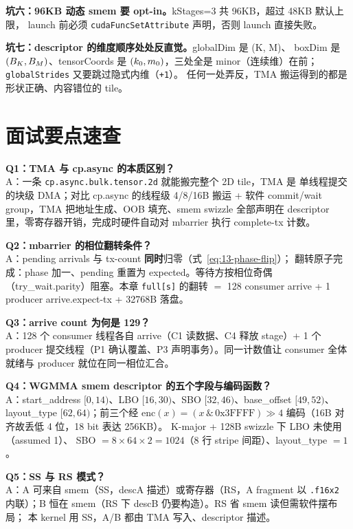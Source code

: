 \textbf{坑六：96KB 动态 smem 要 opt-in。}\allowbreak{}kStages=3 共 96KB，超过 48KB 默认上限，
launch 前必须 \texttt{cuda\allowbreak{}Func\allowbreak{}Set\allowbreak{}Attribute} 声明，否则 launch 直接失败。

\textbf{坑七：descriptor 的维度顺序处处反直觉。}\allowbreak{}globalDim 是 (K, M)、
boxDim 是 $(B\sb{K}, B\sb{M})$、tensorCoords 是 $(k\sb{0}, m\sb{0})$，三处全是
minor（连续维）在前；\texttt{global\allowbreak{}Strides} 又要跳过隐式内维（\texttt{+1}）。
任何一处弄反，TMA 搬运得到的都是形状正确、内容错位的 tile。

\section{面试要点速查}

\textbf{Q1：TMA 与 cp.async 的本质区别？}\\
A：一条 \texttt{cp.\allowbreak{}async.\allowbreak{}bulk.\allowbreak{}tensor.2d} 就能搬完整个 2D tile，TMA 是
单线程提交的块级 DMA；对比 cp.async 的线程级 4/8/16B 搬运 + 软件
commit/wait group，TMA 把地址生成、OOB 填充、smem swizzle 全部声明在
descriptor 里，零寄存器开销，完成时硬件自动对 mbarrier 执行 complete-tx 计数。

\textbf{Q2：mbarrier 的相位翻转条件？}\\
A：pending arrivals 与 tx-count \textbf{同时}归零（式~\ref{eq:13-phase-flip}）；
翻转原子完成：phase 加一、pending 重置为 expected。等待方按相位奇偶
（try\_wait.parity）阻塞。本章 \texttt{full[s]} 的翻转 $=$ 128 consumer arrive
+ 1 producer arrive.expect-tx + 32768B 落盘。

\textbf{Q3：arrive count 为何是 129？}\\
A：128 个 consumer 线程各自 arrive（C1 读数据、C4 释放 stage）+ 1 个 producer
提交线程（P1 确认覆盖、P3 声明事务）。同一计数值让 consumer 全体就绪与
producer 就位在同一相位汇合。

\textbf{Q4：WGMMA smem descriptor 的五个字段与编码函数？}\\
A：start\_address $[0,14)$、LBO $[16,30)$、SBO $[32,46)$、base\_offset $[49,52)$、
layout\_type $[62,64)$；前三个经 $\mathrm{enc}(x) = (x \,\&\,
\mathrm{0x3FFFF}) \gg 4$ 编码（16B 对齐故丢低 4 位，18 bit 表达 256KB）。
K-major + 128B swizzle 下 LBO 未使用（assumed 1）、
SBO $= 8 \times 64 \times 2 = 1024$（8 行 stripe 间距）、layout\_type $= 1$。

\textbf{Q5：SS 与 RS 模式？}\\
A：A 可来自 smem（SS，descA 描述）或寄存器（RS，A fragment 以 \texttt{.f16x2}
内联）；B 恒在 smem（RS 下 descB 仍要构造）。RS 省 smem 读但需软件摆布局；
本 kernel 用 SS，A/B 都由 TMA 写入、descriptor 描述。

